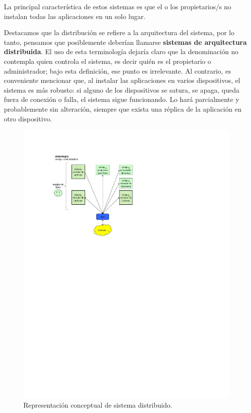 \documentclass[12pt]{report} %
\begin{document}
\begin{itemize}
La principal característica de estos sistemas es que el o los propietarios/s no instalan todas las aplicaciones en un solo lugar.  

Destacamos que la distribución se refiere a la arquitectura del sistema, por lo tanto, pensamos que posiblemente deberían llamarse \textbf{sistemas de arquitectura distribuida}. El uso de esta terminología dejaría claro que la denominación no contempla quien controla el sistema, es decir quién es el propietario o administrador; bajo esta definición, ese punto es irrelevante. Al contrario, es conveniente mencionar que, al instalar las aplicaciones en varios dispositivos, el sistema es más robusto: si alguno de los dispositivos se satura, se apaga, queda fuera de conexión o falla, el sistema sigue funcionando. Lo hará parcialmente y probablemente sin alteración, siempre que exista una réplica de la aplicación en otro dispositivo.


\begin{figure}
\centering
\includegraphics[width=0.85\columnwidth]{imagenes/imagendesc2.pdf}
\caption{Representación conceptual de sistema distribuido.}
\label{imagendesc2}
\end{figure} 


\end{itemize}
\end{document}
